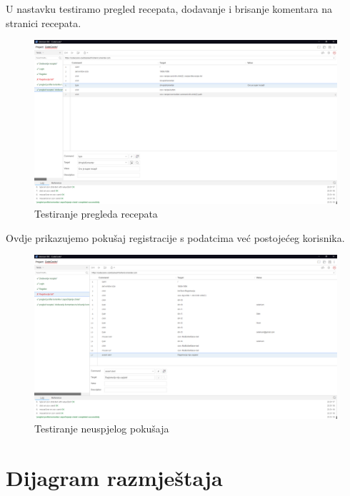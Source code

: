 			U nastavku testiramo pregled recepata, dodavanje i brisanje komentara na stranici recepata.
			
			\begin{figure}[H]
				\includegraphics[scale= 0.25]{slike/test5.png}
				\centering
				\caption{Testiranje pregleda recepata}
				\label{fig:Test5}
			\end{figure}
			
			Ovdje prikazujemo pokušaj registracije s podatcima već postojećeg korisnika.
			
			\begin{figure}[H]
				\includegraphics[scale= 0.25]{slike/test6.png}
				\centering
				\caption{Testiranje neuspjelog pokušaja}
				\label{fig:Test6}
			\end{figure}
			
			 
			
			
			\eject 
		
		
		\section{Dijagram razmještaja}
			
